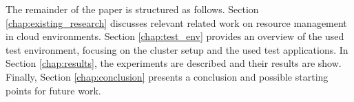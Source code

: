 %
The remainder of the paper is structured as follows. %
Section \ref{chap:existing_research} discusses relevant related work on resource management in cloud environments. Section \ref{chap:test_env} provides an overview of the used test environment, focusing on the cluster setup and the used test applications. In Section \ref{chap:results}, the experiments are described and their results are show. Finally, Section \ref{chap:conclusion} presents a conclusion and possible starting points for future work.
